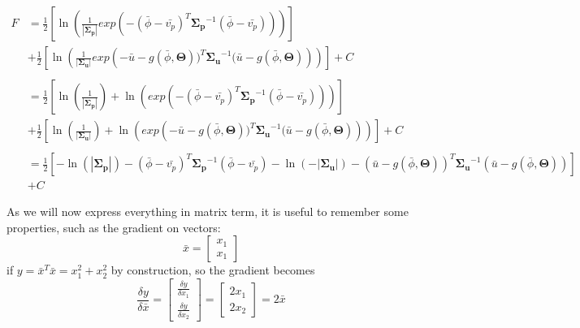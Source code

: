 \begin{equation*} %
    \begin{aligned}
        F &= \frac{1}{2}
        \left[
        \ln \left(
        \frac{1}{|\boldsymbol{\Sigma_p}|}
        exp  \left( -(\bar{\phi} - \bar{v_p})^T \boldsymbol{\Sigma_p}^{-1}  (\bar{\phi} - \bar{v_p}) \right)
        \right) \right] \\
        &+
        \frac{1}{2}
        \left[
        \ln \left(
        \frac{1}{|\boldsymbol{\Sigma_u}|}
        exp  \left( -\bar{u} - g(\bar{\phi}, \boldsymbol{\Theta}))^T \boldsymbol{\Sigma_u}^{-1}  (\bar{u} - g(\bar{\phi}, \boldsymbol{\Theta}) \right)
        \right)
        \right]
        +C \\ \\
        &= \frac{1}{2}
        \left[
        \ln \left(
        \frac{1}{|\boldsymbol{\Sigma_p}|} \right)
        +
        \ln \left( exp  \left( -(\bar{\phi} - \bar{v_p})^T \boldsymbol{\Sigma_p}^{-1}  (\bar{\phi} - \bar{v_p}) \right) \right) \right]\\
        &+
        \frac{1}{2}
        \left[
        \ln \left(
        \frac{1}{|\boldsymbol{\Sigma_u}|} \right)
        +
        \ln \left( exp  \left( -\bar{u} - g(\bar{\phi}, \boldsymbol{\Theta}))^T \boldsymbol{\Sigma_u}^{-1}  (\bar{u} - g(\bar{\phi}, \boldsymbol{\Theta}) \right) \right)
        \right]
        +C \\ \\
        &=
        \frac{1}{2}
            \left[
            - \ln (|\boldsymbol{\Sigma_p}|) -
            (\bar{\phi} - \bar{v_p})^T \boldsymbol{\Sigma_p}^{-1}  (\bar{\phi} - \bar{v_p}) -
            \ln (-|\boldsymbol{\Sigma_u}|) -
            (\bar{u} - g(\bar{\phi}, \boldsymbol{\Theta}))^T \boldsymbol{\Sigma_u}^{-1}  (\bar{u} - g(\bar{\phi}, \boldsymbol{\Theta}))
            \right]
        \\&+C
    \end{aligned}
\end{equation*}

As we will now express everything in matrix term, it is useful to remember some properties, such as the gradient on vectors:
$$
\bar{x} = 
\begin{bmatrix} x_1 \\ x_1 \end{bmatrix}
$$
if $ y = \bar{x}^T\bar{x} = x_1^2+x_2^2$ by construction, so the gradient becomes
$$
\frac{\delta y}{\delta \bar{x}} =
\begin{bmatrix} \frac{\delta y}{\delta x_1} \\ \frac{\delta y}{\delta x_2} \end{bmatrix} =
\begin{bmatrix} 2x_1 \\ 2x_2 \end{bmatrix} =
2\bar{x}
$$

